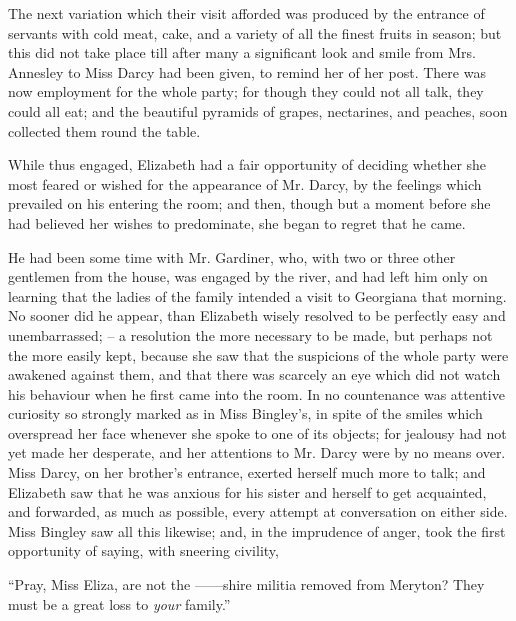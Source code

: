 The next variation which their visit afforded was produced
by the entrance of servants with cold meat, cake,
and a variety of all the finest fruits in season; but this
did not take place till after many a significant look and
smile from Mrs. Annesley to Miss Darcy had been given,
to remind her of her post. There was now employment
for the whole party; for though they could not all talk,
they could all eat; and the beautiful pyramids of grapes,
nectarines, and peaches, soon collected them round the
table.

While thus engaged, Elizabeth had a fair opportunity
of deciding whether she most feared or wished for the
appearance of Mr. Darcy, by the feelings which prevailed
on his entering the room; and then, though but a moment
before she had believed her wishes to predominate, she
began to regret that he came.

He had been some time with Mr. Gardiner, who, with
two or three other gentlemen from the house, was engaged
by the river, and had left him only on learning that the
ladies of the family intended a visit to Georgiana that
morning. No sooner did he appear, than Elizabeth wisely
resolved to be perfectly easy and unembarrassed; --
a resolution the more necessary to be made, but perhaps
not the more easily kept, because she saw that the suspicions
of the whole party were awakened against them,
and that there was scarcely an eye which did not watch
his behaviour when he first came into the room. In no
countenance was attentive curiosity so strongly marked
as in Miss Bingley’s, in spite of the smiles which overspread
her face whenever she spoke to one of its objects; for
jealousy had not yet made her desperate, and her attentions
to Mr. Darcy were by no means over. Miss Darcy,
on her brother’s entrance, exerted herself much more to
talk; and Elizabeth saw that he was anxious for his
sister and herself to get acquainted, and forwarded, as
much as possible, every attempt at conversation on either
side. Miss Bingley saw all this likewise; and, in the
imprudence of anger, took the first opportunity of saying,
with sneering civility,

“Pray, Miss Eliza, are not the ------shire militia removed
from Meryton? They must be a great loss to \textit{your}
family.”

